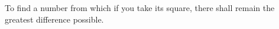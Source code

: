 To find a number from which if you take its square,
there shall remain the greatest difference possible.
